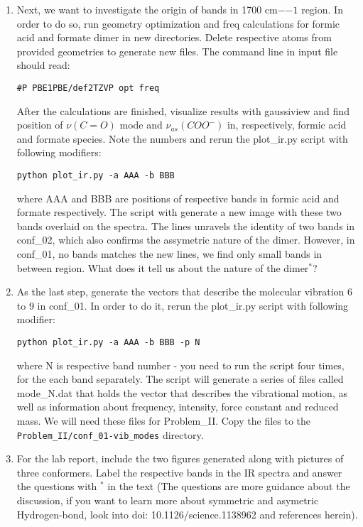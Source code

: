 \documentclass{tufte-handout}
\begin{document}
\begin{enumerate}
	\item Next, we want to investigate the origin of bands in 1700 cm$-{-1}$ region. In order to do so, run geometry optimization and freq calculations for formic acid and formate dimer in new directories. Delete respective atoms from provided geometries to generate new files. The command line in input file should read:
	
	{\tt \#P PBE1PBE/def2TZVP opt freq}
	
	After the calculations are finished, visualize results with gaussiview and find position of $\nu(C=O)$ mode and $\nu_{as}(COO^-)$ in, respectively, formic acid and formate species. Note the numbers and rerun the plot\_ir.py script with following modifiers: 
	
	{\tt python plot\_ir.py -a AAA -b BBB} 
	
	where AAA and BBB are positions of respective bands in formic acid and formate respectively. The script with generate a new image with these two bands overlaid on the spectra. The lines unravels the identity of two bands in conf\_02, which also confirms the assymetric nature of the dimer. However, in conf\_01, no bands matches the new lines, we find only small bands in between region. What does it tell us about the nature of the dimer$^*$? 
	
	\item As the last step, generate the vectors that describe the molecular vibration 6 to 9 in conf\_01. In order to do it, rerun the plot\_ir.py script with following modifier: 
	
	{\tt python plot\_ir.py -a AAA -b BBB -p N}
	
	where N is respective band number - you need to run the script four times, for the each band separately. The script will generate a series of files called mode\_N.dat that holds the vector that describes the vibrational motion, as well as information about frequency, intensity, force constant and reduced mass. We will need these files for Problem\_II. Copy the files to the {\tt Problem\_II/conf\_01-vib\_modes} directory. 
	
	\item For the lab report, include the two figures generated along with pictures of three conformers. Label the respective bands in the IR spectra and answer the questions with $^*$ in the text (The questions are more guidance about the discussion, if you want to learn more about symmetric and asymetric Hydrogen-bond, look into doi: 10.1126/science.1138962 and references herein). 

\end{enumerate}
	
\end{document}
